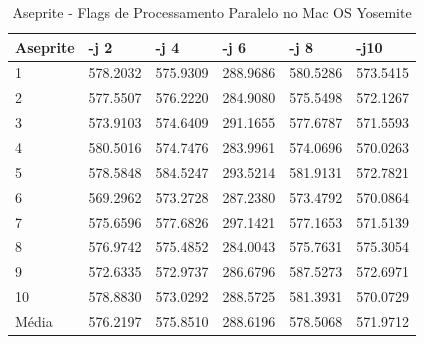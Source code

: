 \begin{table}[!ht]
\centering
\caption{Aseprite - Flags de Processamento Paralelo no Mac OS Yosemite}
\label{tab:flag_processamento_paralelo:mac:aseprite}
\begin{tabular}{llllll}
\textbf{Aseprite} & \textbf{-j 2} & \textbf{-j 4} & \textbf{-j 6} & \textbf{-j 8} & \textbf{-j10}  \\ \toprule
1                 & 578.2032      &   575.9309    &    288.9686   &     580.5286  &   573.5415  \\ 
2                 & 577.5507      &   576.2220    &    284.9080   &     575.5498  &   572.1267  \\ 
3                 & 573.9103      &   574.6409    &    291.1655   &     577.6787  &   571.5593  \\ 
4                 & 580.5016      &   574.7476    &    283.9961   &     574.0696  &   570.0263  \\ 
5                 & 578.5848      &   584.5247    &    293.5214   &     581.9131  &   572.7821  \\ 
6                 & 569.2962      &   573.2728    &    287.2380   &     573.4792  &   570.0864  \\ 
7                 & 575.6596      &   577.6826    &    297.1421   &     577.1653  &   571.5139  \\ 
8                 & 576.9742      &   575.4852    &    284.0043   &     575.7631  &   575.3054  \\ 
9                 & 572.6335      &   572.9737    &    286.6796   &     587.5273  &   572.6971  \\ 
10                & 578.8830      &   573.0292    &    288.5725   &     581.3931  &   570.0729  \\ \bottomrule
Média             & 576.2197      &   575.8510    &    288.6196   &     578.5068  &   571.9712  \\ 
\end{tabular}
\end{table}


